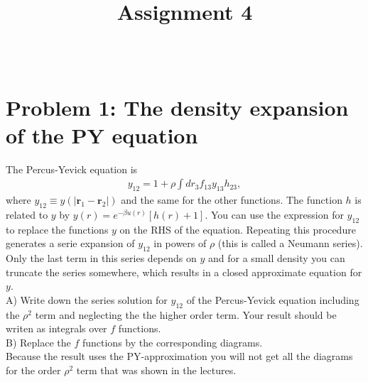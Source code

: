 \documentclass[paper=a4, fontsize=11pt]{scrartcl} %
\title{\vspace{-3cm}
\huge Assignment 4 \\ %
\horrule{2pt} \\ %
\vspace{-2cm}
}
\author{} %
\date{} %
\numberwithin{equation}{section} %
\numberwithin{figure}{section} %
\numberwithin{table}{section} %
\begin{document}
\maketitle %




\section*{Problem 1: The density expansion of the PY equation}

The Percus-Yevick equation is
\begin{align*}
 y_{12} = 1+\rho \int dr_3 f_{13}y_{13}h_{23},
\end{align*}
where $y_{12} \equiv y(|\mathbf{r}_1-\mathbf{r}_2|)$ and the same for the other functions. The function $h$ is related 
to $y$ by $y(r)=e^{-\beta u(r)} \left[ h(r) +1 \right]$. You can use the expression for $y_{12}$ to replace the 
functions $y$ on the RHS of the equation. Repeating this procedure generates a serie expansion of $y_{12}$ in powers of
$\rho$ (this is called a Neumann series). Only the last term in this series depends on $y$ and for a small density you 
can truncate the series somewhere, which results in a closed approximate equation for $y$.
\\

A)\hspace{.5cm}
Write down the series solution for $y_{12}$ of the Percus-Yevick equation including the $\rho^2$ term and neglecting the
the higher order term.
Your result should be writen as integrals over $f$ functions.
\\
B)\hspace{.5cm}
Replace the $f$ functions by the corresponding diagrams.
\\

Because the result uses the PY-approximation you will not get all the diagrams for the order $\rho^2$ term that was
shown in the lectures.
\end{document}
